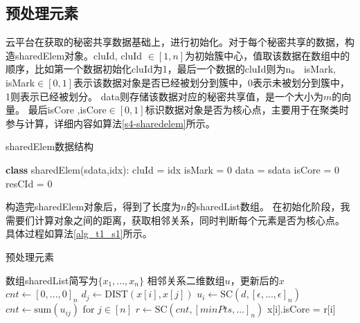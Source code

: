 \subsection{预处理元素}
云平台在获取的秘密共享数据基础上，进行初始化。对于每个秘密共享的数据，构造sharedElem对象。cluId, cluId $ \in [1, n]$为初始簇中心，值取该数据在数组中的顺序，比如第一个数据初始化cluId为1，最后一个数据的cluId则为n。
isMark, isMark$ \in [0,1] $表示该数据对象是否已经被划分到簇中，0表示未被划分到簇中，1则表示已经被划分。
data则存储该数据对应的秘密共享值，是一个大小为$ m $的向量。
最后isCore ,isCore$ \in[0,1]$标识数据对象是否为核心点，主要用于在聚类时参与计算，详细内容如算法\ref{s4-sharedelem}所示。
\begin{algorithm}
	\caption{sharedElem数据结构}
	\label{s4-sharedelem}
	\begin{algorithmic}[1]
		\STATE \textbf{class} sharedElem(sdata,idx):
		\STATE \hspace{\algorithmicindent} cluId = idx
		\STATE \hspace{\algorithmicindent} isMark = 0
		\STATE \hspace{\algorithmicindent} data = sdata
		\STATE \hspace{\algorithmicindent} isCore = 0
		\STATE \hspace{\algorithmicindent} resCId = 0
	\end{algorithmic}
\end{algorithm}

构造完sharedElem对象后，得到了长度为$ n $的sharedList数组。
在初始化阶段，我需要们计算对象之间的距离，获取相邻关系，同时判断每个元素是否为核心点。
具体过程如算法\ref{alg_t1_s1}所示。

\begin{algorithm}[htbp]
	\renewcommand{\algorithmicrequire}{\textbf{输入:}}
	\renewcommand{\algorithmicensure}{\textbf{输出:}}
	\caption{预处理元素}
	\label{alg_t1_s1}
	\begin{algorithmic}[1]
		\REQUIRE 数组sharedList简写为$ \{x_1,...,x_n\} $
		\ENSURE 相邻关系二维数组$ u $，更新后的$ x $
		\STATE $ cnt \leftarrow [0,...,0]_n $
		\STATE $ d_{j} \leftarrow \text{DIST}(x[i], x[j]) $
		\ENDFOR
		\STATE $ u_i \leftarrow \text{SC}(d, [\epsilon,...,\epsilon]_n) $
		\STATE $ cnt \leftarrow \text{sum}(u_{ij})$ for $j \in [n] $
		\ENDFOR
		\STATE $ r \leftarrow \text{SC}(cnt, [minPts,...]_n) $
		\STATE x[i].isCore = r[i]
		\ENDFOR
	\end{algorithmic}
\end{algorithm}

